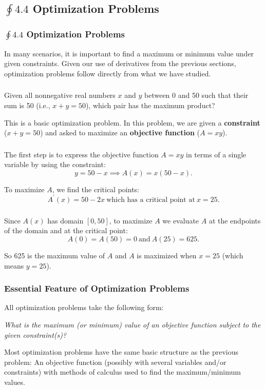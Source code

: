 \documentclass[14pt]{beamer}
\begin{document}
\begin{frame}
\subsection[$\oint 4.4$ Optimization Problems]{$\oint 4.4$ Optimization Problems}
\frametitle{$\oint 4.4$ Optimization Problems}
\small
In many scenarios, it is important to find a maximum or minimum value under given constraints.  Given our use of derivatives from the previous sections, optimization problems follow directly from what we have studied.
\end{frame}

\begin{frame}
\frametitle{}
\small
\begin{que} Given all nonnegative real numbers $x$ and $y$ between 0 and 50 such that their sum is 50 (i.e., $x+y=50$), which pair has the maximum product? \end{que}

\vspace{2pc}
This is a basic optimization problem.  In this problem, we are given a \alert{\bf constraint} ($x+y=50$) and asked to maximize an \alert{\bf objective function} ($A=xy$).
\end{frame}

\begin{frame}
\frametitle{}
\small
The first step is to express the objective function $A=xy$ in terms of a \alert{single variable} by using the constraint:
\[y=50-x \implies A(x)=x(50-x).\]

\vspace{2pc}
To maximize $A$, we find the critical points:
\[A^{\prime}(x)=50-2x\ \text{which has a critical point at}\ x=25.\]
\end{frame}

\begin{frame}
\frametitle{}
Since $A(x)$ has domain $[0,50]$, to maximize $A$ we evaluate $A$ \alert{at the endpoints of the domain and at the critical point}:
\[A(0)=A(50)=0\ \text{and}\ A(25)=625.\]

\vspace{2pc}
So 625 is the maximum value of $A$ and $A$ is maximized when $x=25$ (which means $y=25$).
\end{frame}

\begin{frame}
\frametitle{\small Essential Feature of Optimization Problems}
\small
All optimization problems take the following form:
\begin{center}
\alert{\it What is the maximum (or minimum) value of an objective function subject to the given constraint(s)?}
\end{center}

\vspace{2pc}
Most optimization problems have the same basic structure as the previous problem:  An objective function (possibly with several variables and/or constraints) with methods of calculus used to find the maximum/minimum values.
\end{frame}
\end{document}
